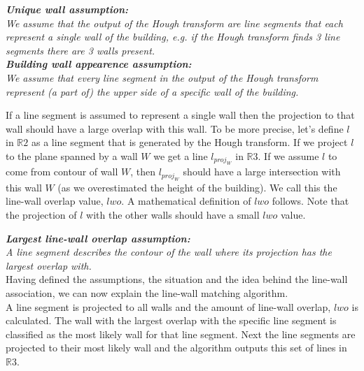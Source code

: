 	\textbf{	\emph{Unique wall assumption:}}\\
	\emph{We assume that the output of the Hough transform are line segments
	that each represent a single wall of the building, e.g. if the Hough
	transform finds 3 line segments there are 3 walls present.}\\

	\textbf{	\emph{Building wall appearence assumption:}}\\
	\emph{We assume that every line segment in the output of the Hough transform represent (a part of) the upper side of
	a specific wall of the building.}

	If a line segment is assumed to represent a single wall then the projection
	to that wall should have a large overlap with this wall.  To be more
	precise, let's define $l$ in $\mathbb{R}2$ as a line segment that is
	generated by the Hough transform.  If we project $l$ to the plane spanned
	by a wall $W$ we get a line $l_{proj_W}$ in $\mathbb{R}3$.  If we assume
	$l$ to come from contour of wall $W$, then $l_{proj_W}$ should have a large
	intersection with this wall $W$ (as we overestimated the height of the
	building). We call this the line-wall overlap value, $lwo$.  A mathematical
	definition of $lwo$ follows.  Note that the projection of $l$ with the
	other walls should have a small $lwo$ value.

	\textbf{	\emph{Largest line-wall overlap assumption:}}\\
	\emph{A line segment describes the contour of the wall where its projection
	has the largest overlap with.}\\

	Having defined the assumptions, the situation and the idea behind the
	line-wall association, we can now explain the line-wall matching algorithm.\\ 

	A line segment is projected to all walls and the amount of line-wall
	overlap, $lwo$ is calculated. The wall with the largest overlap with the specific line
segment is classified as the most likely wall for that line segment.
	Next the line segments are projected to their most likely wall and the
	algorithm outputs this set of lines in $\mathbb{R}3$. 
	

